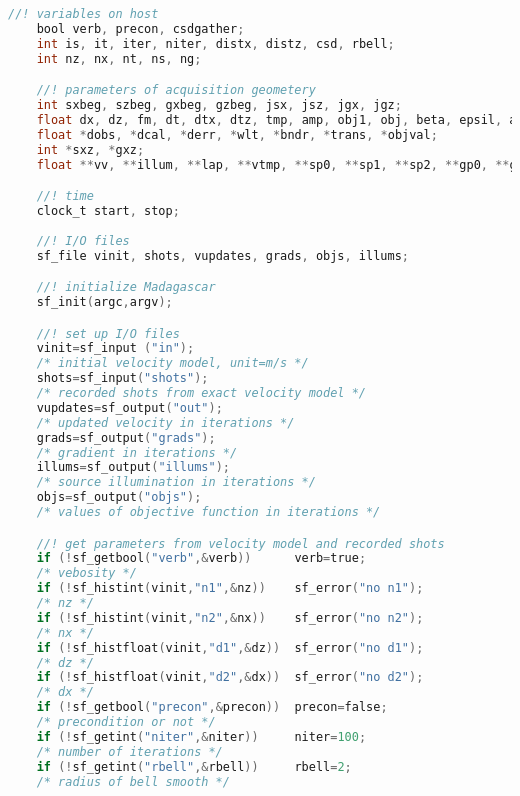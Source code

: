 \documentclass[a4paper,11pt]{article}
\theoremstyle{mytheor}
\begin{document}
\begin{lstlisting}[label={main},language=C,tabsize=4,caption=main()]
	//! variables on host 
	bool verb, precon, csdgather;
	int is, it, iter, niter, distx, distz, csd, rbell;
	int nz, nx, nt, ns, ng;

	//! parameters of acquisition geometery 
	int sxbeg, szbeg, gxbeg, gzbeg, jsx, jsz, jgx, jgz;
	float dx, dz, fm, dt, dtx, dtz, tmp, amp, obj1, obj, beta, epsil, alpha;
	float *dobs, *dcal, *derr, *wlt, *bndr, *trans, *objval;
	int *sxz, *gxz;		
	float **vv, **illum, **lap, **vtmp, **sp0, **sp1, **sp2, **gp0, **gp1, **gp2, **g0, **g1, **cg, *alpha1, *alpha2, **ptr=NULL;	

    //! time
	clock_t start, stop;
	
	//! I/O files
	sf_file vinit, shots, vupdates, grads, objs, illums;

	//! initialize Madagascar
	sf_init(argc,argv);

	//! set up I/O files 
	vinit=sf_input ("in");   	
	/* initial velocity model, unit=m/s */
	shots=sf_input("shots"); 	
	/* recorded shots from exact velocity model */
	vupdates=sf_output("out"); 	
	/* updated velocity in iterations */ 
	grads=sf_output("grads");  	
	/* gradient in iterations */ 
	illums=sf_output("illums");	
	/* source illumination in iterations */
	objs=sf_output("objs");		
	/* values of objective function in iterations */

	//! get parameters from velocity model and recorded shots 
	if (!sf_getbool("verb",&verb)) 		verb=true;			
	/* vebosity */
	if (!sf_histint(vinit,"n1",&nz)) 	sf_error("no n1");	
	/* nz */
	if (!sf_histint(vinit,"n2",&nx)) 	sf_error("no n2");	
	/* nx */
	if (!sf_histfloat(vinit,"d1",&dz)) 	sf_error("no d1");	
	/* dz */
	if (!sf_histfloat(vinit,"d2",&dx)) 	sf_error("no d2");	
	/* dx */
	if (!sf_getbool("precon",&precon)) 	precon=false;	
	/* precondition or not */
	if (!sf_getint("niter",&niter))   	niter=100;		
	/* number of iterations */
	if (!sf_getint("rbell",&rbell))	  	rbell=2;		
	/* radius of bell smooth */


\end{lstlisting}
\end{document}

